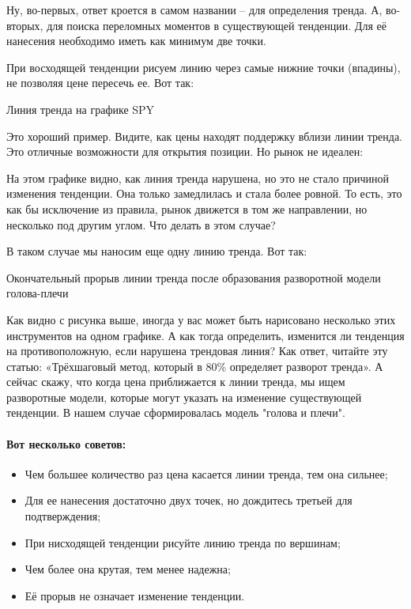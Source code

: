 \documentclass{book}
\begin{document}
Ну, во-первых, ответ кроется в самом названии – для определения тренда. А, во-вторых, для поиска переломных моментов в существующей тенденции. Для её нанесения необходимо иметь как минимум две точки.

При восходящей тенденции рисуем линию через самые нижние точки (впадины), не позволяя цене пересечь ее. Вот так:

Линия тренда на графике SPY

Это хороший пример. Видите, как цены находят поддержку вблизи линии тренда. Это отличные возможности для открытия позиции. Но рынок не идеален:

На этом графике видно, как линия тренда нарушена, но это не стало причиной изменения тенденции. Она только замедлилась и стала более ровной. То есть, это как бы исключение из правила, рынок движется в том же направлении, но несколько под другим углом. Что делать в этом случае?

В таком случае мы наносим еще одну линию тренда. Вот так:

Окончательный прорыв линии тренда после образования разворотной модели голова-плечи

Как видно с рисунка выше, иногда у вас может быть нарисовано несколько этих инструментов на одном графике. А как тогда определить, изменится ли тенденция на противоположную, если нарушена трендовая линия? Как ответ, читайте эту статью: «Трёхшаговый метод, который в 80\% определяет разворот тренда».  А сейчас скажу, что когда цена приближается к линии тренда, мы ищем разворотные модели, которые могут указать на изменение существующей тенденции. В нашем случае сформировалась модель "голова и плечи".

\paragraph{Вот несколько советов:}
\begin{itemize}
\item Чем большее количество раз цена касается линии тренда, тем она сильнее;
\item Для ее нанесения достаточно двух точек, но дождитесь третьей для подтверждения;
\item При нисходящей тенденции рисуйте линию тренда по вершинам;
\item Чем более она крутая, тем менее надежна;
\item Её прорыв не означает изменение тенденции.
\end{itemize}
\end{document}

